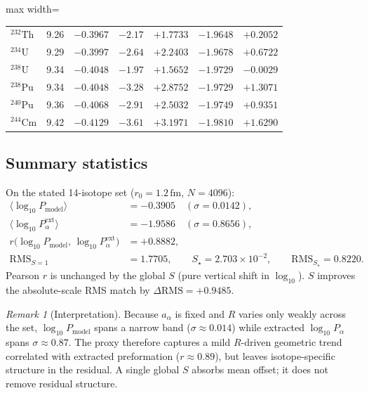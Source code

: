 \documentclass[11pt,a4paper]{article}
\theoremstyle{remark}
\newtheorem*{remark}{Remark}
\begin{document}
\begin{table}[H]
\begin{adjustbox}{max width=\linewidth}
\begin{tabular}{lcccccc}
$^{232}\mathrm{Th}$ & 9.26 & $-0.3967$ & $-2.17$ & $+1.7733$ & $-1.9648$ & $+0.2052$ \\
$^{234}\mathrm{U}$  & 9.29 & $-0.3997$ & $-2.64$ & $+2.2403$ & $-1.9678$ & $+0.6722$ \\
$^{238}\mathrm{U}$  & 9.34 & $-0.4048$ & $-1.97$ & $+1.5652$ & $-1.9729$ & $-0.0029$ \\
$^{238}\mathrm{Pu}$ & 9.34 & $-0.4048$ & $-3.28$ & $+2.8752$ & $-1.9729$ & $+1.3071$ \\
$^{240}\mathrm{Pu}$ & 9.36 & $-0.4068$ & $-2.91$ & $+2.5032$ & $-1.9749$ & $+0.9351$ \\
$^{244}\mathrm{Cm}$ & 9.42 & $-0.4129$ & $-3.61$ & $+3.1971$ & $-1.9810$ & $+1.6290$ \\
\bottomrule
\end{tabular}\end{adjustbox}
\end{table}

\subsection{Summary statistics}
On the stated 14-isotope set ($r_0=1.2\,\mathrm{fm}$, $N=4096$):
\begin{align*}
\langle\log_{10} P_{\mathrm{model}}\rangle &= -0.3905
\quad(\sigma=0.0142),\\
\langle\log_{10} P_\alpha^{\mathrm{ext}}\rangle &= -1.9586
\quad(\sigma=0.8656),\\
r\bigl(\log_{10} P_{\mathrm{model}},\,\log_{10} P_\alpha^{\mathrm{ext}}\bigr)
&= +0.8882,\\
\mathrm{RMS}_{S=1} &= 1.7705,\qquad
S_{\star}=2.703\times 10^{-2},\qquad
\mathrm{RMS}_{S_\star}=0.8220.
\end{align*}
Pearson $r$ is unchanged by the global $S$ (pure vertical shift in
$\log_{10}$).  $S$ improves the absolute-scale RMS match by
$\Delta\mathrm{RMS}=+0.9485$.

\begin{remark}[Interpretation]
Because $a_\alpha$ is fixed and $R$ varies only weakly across the set,
$\log_{10} P_{\mathrm{model}}$ spans a narrow band ($\sigma\approx 0.014$)
while extracted $\log_{10} P_\alpha$ spans $\sigma\approx 0.87$.  The
proxy therefore captures a mild $R$-driven geometric trend correlated with
extracted preformation ($r\approx 0.89$), but leaves isotope-specific
structure in the residual.  A single global $S$ absorbs mean offset; it
does not remove residual structure.
\end{remark}
\end{document}

